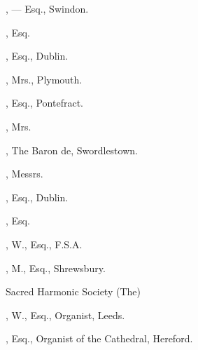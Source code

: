 \begin{multicols}{2}
, — Esq., Swindon.

, Esq.

, Esq., Dublin.

, Mrs., Plymouth.

, Esq., Pontefract.

, Mrs.

, The Baron de, Swordlestown.

, Messrs.
\bigskip

, Esq., Dublin.

, Esq.

, W., Esq., F.S.A.

, M., Esq., Shrewsbury.

Sacred Harmonic Society (The)

, W., Esq., Organist, Leeds.

, Esq., Organist of the
Cathedral, Hereford.
\end{multicols}
\pagebreak
